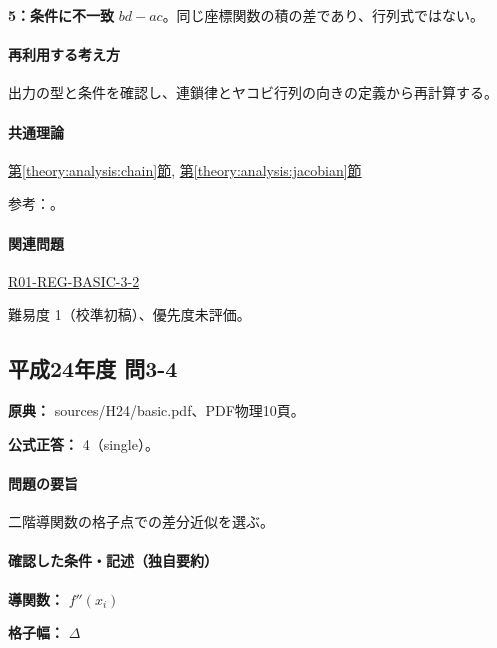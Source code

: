 \noindent\textbf{5：条件に不一致} \(bd-ac\)。同じ座標関数の積の差であり、行列式ではない。\par

\paragraph{再利用する考え方} 出力の型と条件を確認し、連鎖律とヤコビ行列の向きの定義から再計算する。

\paragraph{共通理論} \hyperref[theory:analysis:chain]{第\ref*{theory:analysis:chain}節}, \hyperref[theory:analysis:jacobian]{第\ref*{theory:analysis:jacobian}節}

\par 参考：\cite{mit_chain2007}。

\paragraph{関連問題} \hyperref[q:r01-reg-basic-3-2]{R01-REG-BASIC-3-2}

\par 難易度 1（校準初稿）、優先度未評価。

\subsection{平成24年度 問3-4}
\label{q:h24-reg-basic-3-4}

\noindent\textbf{原典：} sources/H24/basic.pdf、PDF物理10頁。

\textbf{公式正答：} 4（single）。

\paragraph{問題の要旨} 二階導関数の格子点での差分近似を選ぶ。

\paragraph{確認した条件・記述（独自要約）}\mbox{}\par

\noindent\textbf{導関数：} \(f''(x_i)\)\par

\noindent\textbf{格子幅：} \(\Delta\)\par

